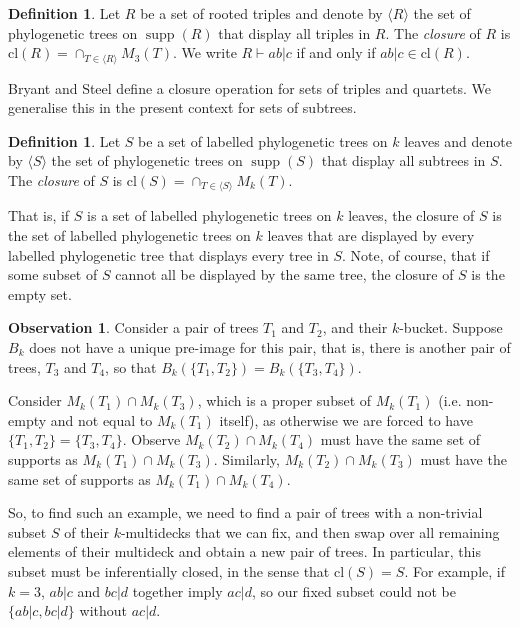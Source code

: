 \documentclass[12pt]{article}
\theoremstyle{definition}
\newtheorem{Definition}[Theorem]{Definition}
\newtheorem{Observation}[Theorem]{Observation}
\DeclareMathOperator{\supp}{supp}
\begin{document}
\begin{Definition}
    Let $R$ be a set of rooted triples and denote by $\langle R \rangle$ the set of phylogenetic trees on $\supp(R)$ that display all triples in $R$. The \emph{closure} of $R$ is $\text{cl}(R) = \cap_{T \in \langle R \rangle} M_3(T)$. We write $R \vdash ab|c$ if and only if $ab|c \in \text{cl}(R)$.
\end{Definition}

Bryant and Steel \cite{bryant1995extension} define a closure operation for sets of triples and quartets. We generalise this in the present context for sets of subtrees.

\begin{Definition}
    Let $S$ be a set of labelled phylogenetic trees on $k$ leaves and denote by $\langle S \rangle$ the set of phylogenetic trees on $\supp(S)$ that display all subtrees in $S$. The \emph{closure} of $S$ is $\text{cl}(S) = \cap_{T \in \langle S \rangle} M_k(T)$.
\end{Definition}

That is, if $S$ is a set of labelled phylogenetic trees on $k$ leaves, the closure of $S$ is the set of labelled phylogenetic trees on $k$ leaves that are displayed by every labelled phylogenetic tree that displays every tree in $S$. Note, of course, that if some subset of $S$ cannot all be displayed by the same tree, the closure of $S$ is the empty set.

\begin{Observation}
    \label{o:infer.closed}
    Consider a pair of trees $T_1$ and $T_2$, and their $k$-bucket. Suppose $B_k$ does not have a unique pre-image for this pair, that is, there is another pair of trees, $T_3$ and $T_4$, so that $B_k(\{T_1,T_2\})=B_k(\{T_3,T_4\})$.

    Consider $M_k(T_1) \cap M_k(T_3)$, which is a proper subset of $M_k(T_1)$ (i.e. non-empty and not equal to $M_k(T_1)$ itself), as otherwise we are forced to have $\{T_1,T_2\}=\{T_3,T_4\}$. Observe $M_k(T_2) \cap M_k(T_4)$ must have the same set of supports as $M_k(T_1) \cap M_k(T_3)$. Similarly, $M_k(T_2) \cap M_k(T_3)$ must have the same set of supports as $M_k(T_1) \cap M_k(T_4)$.

    So, to find such an example, we need to find a pair of trees with a non-trivial subset $S$ of their $k$-multidecks that we can fix, and then swap over all remaining elements of their multideck and obtain a new pair of trees. In particular, this subset must be inferentially closed, in the sense that $\text{cl}(S) =S$. For example, if $k=3$, $ab|c$ and $bc|d$ together imply $ac|d$, so our fixed subset could not be $\{ab|c,bc|d\}$ without $ac|d$.
\end{Observation}
\end{document}
